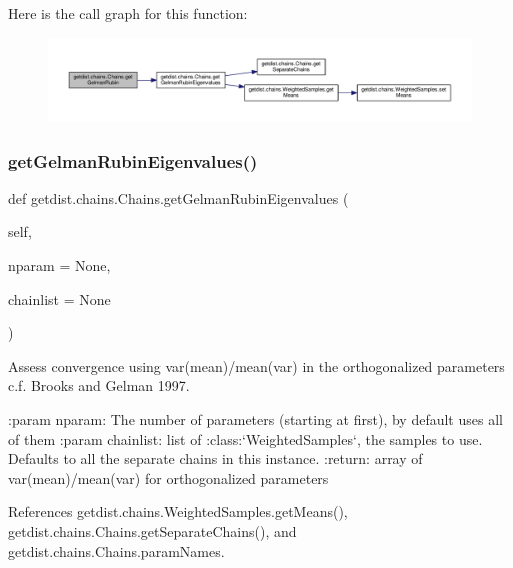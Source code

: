 Here is the call graph for this function\+:
\nopagebreak
\begin{figure}[H]
\begin{center}
\leavevmode
\includegraphics[width=350pt]{classgetdist_1_1chains_1_1Chains_a2f1bea2051f7de3e3b5cf65cbfab872d_cgraph}
\end{center}
\end{figure}
\mbox{\label{classgetdist_1_1chains_1_1Chains_a0485362be9aa8aa89b8071b59dbefae5}} 
\subsubsection{\texorpdfstring{get\+Gelman\+Rubin\+Eigenvalues()}{getGelmanRubinEigenvalues()}}
{\footnotesize\ttfamily def getdist.\+chains.\+Chains.\+get\+Gelman\+Rubin\+Eigenvalues (\begin{DoxyParamCaption}\item[{}]{self,  }\item[{}]{nparam = {\ttfamily None},  }\item[{}]{chainlist = {\ttfamily None} }\end{DoxyParamCaption})}

\begin{DoxyVerb}Assess convergence using var(mean)/mean(var) in the orthogonalized parameters
c.f. Brooks and Gelman 1997.

:param nparam: The number of parameters (starting at first), by default uses all of them
:param chainlist: list of :class:`WeightedSamples`, the samples to use. Defaults to all the separate chains in this instance.
:return: array of  var(mean)/mean(var) for orthogonalized parameters
\end{DoxyVerb}
 

References getdist.\+chains.\+Weighted\+Samples.\+get\+Means(), getdist.\+chains.\+Chains.\+get\+Separate\+Chains(), and getdist.\+chains.\+Chains.\+param\+Names.



